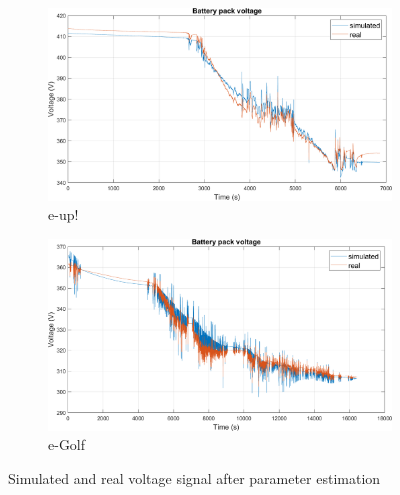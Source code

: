 \begin{figure}[htbp!]
\centering
\begin{subfigure}{\textwidth}
    \centering
    \includegraphics[width=\textwidth]{images/par_est_V_eup}
    \caption{e-up!}
\end{subfigure}

\vspace{20pt}

\begin{subfigure}{\textwidth}
    \centering
    \includegraphics[width=\textwidth]{images/par_est_V_egolf}
    \caption{e-Golf}
\end{subfigure}
\caption[Simulated and real voltage signal after parameter estimation]{Simulated and real voltage signal after parameter estimation}
\label{fig:par_est_comparison_V}
\end{figure}

